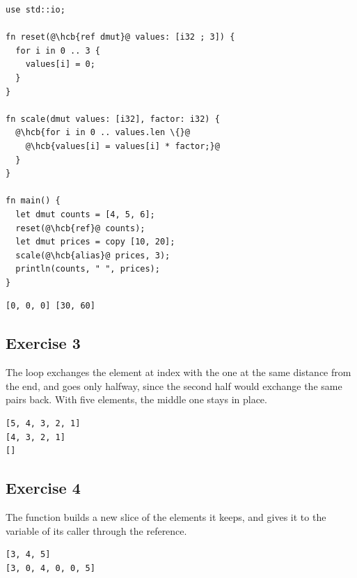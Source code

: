 \begin{lstlisting}[style=coloredverbatim, escapechar=@, caption=Solution for exercise 2]
use std::io;

fn reset(@\hcb{ref dmut}@ values: [i32 ; 3]) {
  for i in 0 .. 3 {
    values[i] = 0;
  }
}

fn scale(dmut values: [i32], factor: i32) {
  @\hcb{for i in 0 .. values.len \{}@
    @\hcb{values[i] = values[i] * factor;}@
  }
}

fn main() {
  let dmut counts = [4, 5, 6];
  reset(@\hcb{ref}@ counts);
  let dmut prices = copy [10, 20];
  scale(@\hcb{alias}@ prices, 3);
  println(counts, " ", prices);
}
\end{lstlisting}
\vspace{-10pt}%
\begin{lstlisting}[style=bashVerb]
[0, 0, 0] [30, 60]
\end{lstlisting}

\subsection*{Exercise 3}

The loop exchanges the element at index  with the one at the same
distance from the end, and goes only halfway, since the second half would
exchange the same pairs back. With five elements, the middle one stays in place.


\vspace{-10pt}%
\begin{lstlisting}[style=bashVerb]
[5, 4, 3, 2, 1]
[4, 3, 2, 1]
[]
\end{lstlisting}

\subsection*{Exercise 4}

The function builds a new slice of the elements it keeps, and gives it to the
variable of its caller through the reference.


\vspace{-10pt}%
\begin{lstlisting}[style=bashVerb]
[3, 4, 5]
[3, 0, 4, 0, 0, 5]
\end{lstlisting}

